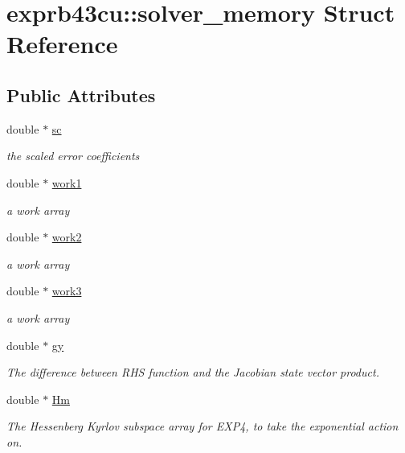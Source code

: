 \hypertarget{structexprb43cu_1_1solver__memory}{}\section{exprb43cu\+:\+:solver\+\_\+memory Struct Reference}
\label{structexprb43cu_1_1solver__memory}
\subsection*{Public Attributes}
\begin{DoxyCompactItemize}
\item 
double $\ast$ \hyperlink{structexprb43cu_1_1solver__memory_aff9b454c8a0c5ecef261b359c44db926}{sc}
\begin{DoxyCompactList}\small\item\em the scaled error coefficients \end{DoxyCompactList}\item 
double $\ast$ \hyperlink{structexprb43cu_1_1solver__memory_a97191dca9ff8d04d16d37b26fbea4906}{work1}
\begin{DoxyCompactList}\small\item\em a work array \end{DoxyCompactList}\item 
double $\ast$ \hyperlink{structexprb43cu_1_1solver__memory_a9339316b1097345efa3b55832b3d0d1c}{work2}
\begin{DoxyCompactList}\small\item\em a work array \end{DoxyCompactList}\item 
double $\ast$ \hyperlink{structexprb43cu_1_1solver__memory_ae3a2fe062018c4b7f97f039feceeb003}{work3}
\begin{DoxyCompactList}\small\item\em a work array \end{DoxyCompactList}\item 
double $\ast$ \hyperlink{structexprb43cu_1_1solver__memory_a020f6e5fb98c3395373e8098c0b726ee}{gy}
\begin{DoxyCompactList}\small\item\em The difference between R\+HS function and the Jacobian state vector product. \end{DoxyCompactList}\item 
double $\ast$ \hyperlink{structexprb43cu_1_1solver__memory_a2ca03f02755ba0786e0460f33542216b}{Hm}
\begin{DoxyCompactList}\small\item\em The Hessenberg Kyrlov subspace array for E\+X\+P4, to take the exponential action on. \end{DoxyCompactList}\item 

\end{DoxyCompactItemize}
